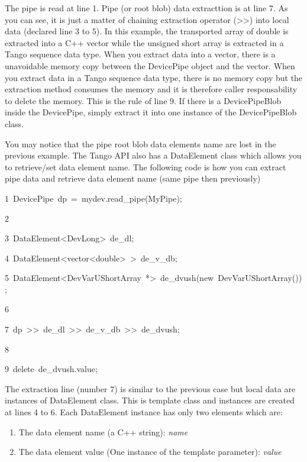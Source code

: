The pipe is read at line 1. Pipe (or root blob) data extracttion is
at line 7. As you can see, it is just a matter of chaining extraction
operator (\textquotedbl{}>\textcompwordmark{}>\textquotedbl{}) into
local data (declared line 3 to 5). In this example, the transported
array of double is extracted into a C++ vector while the unsigned
short array is extracted in a Tango sequence data type. When you extract
data into a vector, there is a unavoidable memory copy between the
DevicePipe object and the vector. When you extract data in a Tango
sequence data type, there is no memory copy but the extraction method
consumes the memory and it is therefore caller responsability to delete
the memory. This is the rule of line 9. If there is a DevicePipeBlob
inside the DevicePipe, simply extract it into one instance of the
DevicePipeBlob class.

You may notice that the pipe root blob data elements name are lost
in the previous example. The Tango API also has a DataElement
class which allows you to retrieve/set data element name. The following
code is how you can extract pipe data and retrieve data element name
(same pipe then previously)


\begin{lyxcode}
1~DevicePipe~dp~=~mydev.read\_pipe(\textquotedbl{}MyPipe\textquotedbl{});

2~

3~DataElement<DevLong>~de\_dl;~~

4~DataElement<vector<double>~>~de\_v\_db;~~

5~DataElement<DevVarUShortArray~{*}>~de\_dvush(new~DevVarUShortArray());

6~

7~dp~>\textcompwordmark{}>~de\_dl~>\textcompwordmark{}>~de\_v\_db~>\textcompwordmark{}>~de\_dvush;

8

9~delete~de\_dvush.value;
\end{lyxcode}


The extraction line (number 7) is similar to the previous case but
local data are instances of DataElement class. This is template class
and instances are created at lines 4 to 6. Each DataElement instance
has only two elements which are:
\begin{enumerate}
\item The data element name (a C++ string): \emph{name}
\item The data element value (One instance of the template parameter): \emph{value}
\end{enumerate}


